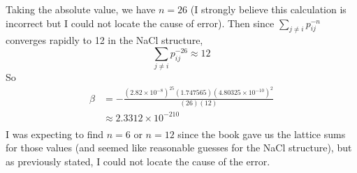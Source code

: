 \documentclass{article}
\begin{document}
Taking the absolute value, we have $n = 26$ (I strongly believe this calculation is incorrect but I could not locate the cause of error). Then since $\sum_{j\neq i} p_{ij}^{-n}$ converges rapidly to 12 in the NaCl structure, 
\[\sum_{j \neq i}p_{ij}^{-26} \approx 12\]
So 
\begin{align*}
    \beta &= -\frac{(2.82\times 10^{-8})^{25}(1.747565)(4.80325\times 10^{-10})^2}{(26)(12)} \\
    &\approx 2.3312 \times 10^{-210} \\
\end{align*}
I was expecting to find $n = 6$ or $n = 12$ since the book gave us the lattice sums for those values (and seemed like reasonable guesses for the NaCl structure), but as previously stated, I could not locate the cause of the error.
\end{document}
